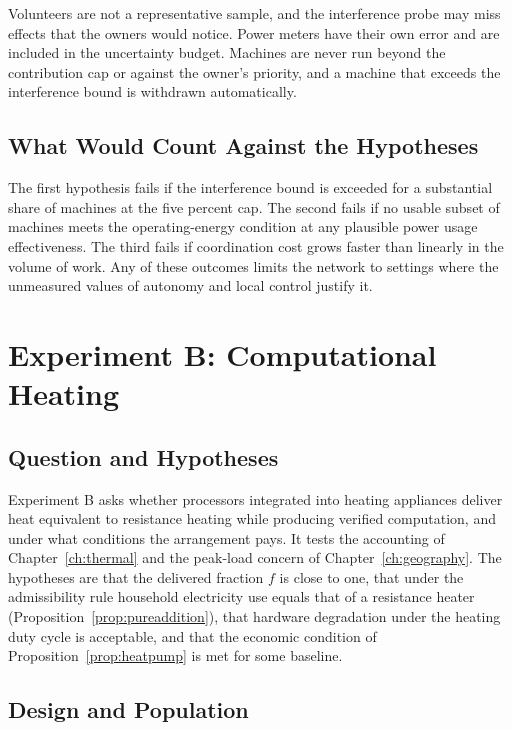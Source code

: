 Volunteers are not a representative sample, and the interference probe may miss effects that the owners would notice. Power meters have their own error and are included in the uncertainty budget. Machines are never run beyond the contribution cap or against the owner's priority, and a machine that exceeds the interference bound is withdrawn automatically.

\subsection*{What Would Count Against the Hypotheses}

The first hypothesis fails if the interference bound is exceeded for a substantial share of machines at the five percent cap. The second fails if no usable subset of machines meets the operating-energy condition at any plausible power usage effectiveness. The third fails if coordination cost grows faster than linearly in the volume of work. Any of these outcomes limits the network to settings where the unmeasured values of autonomy and local control justify it.

\section{Experiment B: Computational Heating}

\subsection*{Question and Hypotheses}

Experiment B asks whether processors integrated into heating appliances deliver heat equivalent to resistance heating while producing verified computation, and under what conditions the arrangement pays. It tests the accounting of Chapter~\ref{ch:thermal} and the peak-load concern of Chapter~\ref{ch:geography}. The hypotheses are that the delivered fraction $f$ is close to one, that under the admissibility rule household electricity use equals that of a resistance heater (Proposition~\ref{prop:pureaddition}), that hardware degradation under the heating duty cycle is acceptable, and that the economic condition of Proposition~\ref{prop:heatpump} is met for some baseline.

\subsection*{Design and Population}

